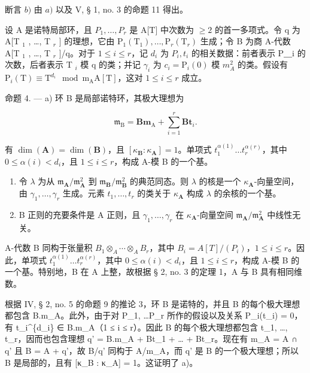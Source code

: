 断言 \(b)\) 由 \(a)\) 以及 V, § 1, no. 3 的命题 11 得出。

设 A 是诺特局部环，且 \(P_{1}, \ldots, P_{r}\) 是 A{[}T{]} 中次数为 \(\geqslant 2\) 的首一多项式。令 q 为 A{[}T \(_{1}\) , \ldots, T \(_{r}\) {]} 的理想，它由 \(\mathrm{P}_{1}(\mathrm{T}_{1}), \ldots, \mathrm{P}_{r}(\mathrm{T}_{r})\) 生成；令 B 为商 A-代数 A{[}T \(_{1}\) , \ldots, T \(_{r}\) {]}/q。对于 \(1 \leqslant i \leqslant r\)，记 \(d_{i}\) 为 \(P_{i}, t_{i}\) 的相关数据：前者表示 P＿i 的次数，后者表示 T \(_{i}\) 模 q 的类；并记 \(\gamma_{i}\) 为 \(c_{i} = \mathrm{P}_{i}(0)\) 模 \(m_{A}^{2}\) 的类。假设有 \(\mathrm{P}_{i}(\mathrm{T}) \equiv \mathrm{T}^{d_{i}} \mod \mathrm{m}_{\mathrm{A}}\mathrm{A}[\mathrm{T}]\)，这对 \(1 \leqslant i \leqslant r\) 成立。

命题 4. --- a) 环 B 是局部诺特环，其极大理想为

\[
\mathfrak {m} _ {\mathrm{B}} = \mathbf {B m} _ {\mathrm{A}} + \sum_ {i = 1} ^ {r} \mathbf {B t} _ {i}.
\]

有 \(\dim(\mathbf{A}) = \dim(\mathbf{B})\)，且 \([\kappa_{\mathbf{B}}: \kappa_{\mathbf{A}}] = 1\)。单项式 \(t_1^{\alpha(1)} \ldots t_r^{\alpha(r)}\)，其中 \(0 \leqslant \alpha(i) < d_i\)，且 \(1 \leqslant i \leqslant r\)，构成 A-模 B 的一个基。

\begin{enumerate}
\def\labelenumi{\alph{enumi})}
\setcounter{enumi}{1}
\item
  令 \(\lambda\) 为从 \(\mathfrak{m}_{\mathbf{A}} / \mathfrak{m}_{\mathbf{A}}^{2}\) 到 \(\mathfrak{m}_{\mathbf{B}} / \mathfrak{m}_{\mathbf{B}}^{2}\) 的典范同态。则 \(\lambda\) 的核是一个 \(\kappa_{\mathbf{A}}\)-向量空间，由 \(\gamma_{1}, \ldots, \gamma_{r}\) 生成。元素 \(t_{1}, \ldots, t_{r}\) 的类关于 \(\kappa_{\mathbf{A}}\) 构成 \(\lambda\) 的余核的一个基。
\item
  B 正则的充要条件是 A 正则，且 \(\gamma_{1},\ldots,\gamma_{r}\) 在 \(\kappa_{\mathbf{A}}\)-向量空间 \(\mathfrak{m}_{\mathbf{A}}/\mathfrak{m}_{\mathbf{A}}^{2}\) 中线性无关。
\end{enumerate}

A-代数 B 同构于张量积 \(B_{1} \otimes_{A} \cdots \otimes_{A} B_{r}\)，其中 \(B_{i} = A[T]/(P_{i})\)，\(1 \leqslant i \leqslant r\)。因此，单项式 \(t_{1}^{\alpha(1)} \ldots t_{r}^{\alpha(r)}\)，其中 \(0 \leqslant \alpha(i) < d_{i}\)，且 \(1 \leqslant i \leqslant r\)，构成 A-模 B 的一个基。特别地，B 在 A 上整，故根据 § 2, no. 3 的定理 1，A 与 B 具有相同维数。

根据 IV, § 2, no. 5 的命题 9 的推论 3，环 B 是诺特的，并且 B 的每个极大理想都包含 B.m\_A。此外，由于对 P\_1, \ldots P\_r 所作的假设以及关系 P\_i(t\_i) = 0，有 t\_i\^{}\{d\_i\} ∈ B.m\_A（1 ≤ i ≤ r）。因此 B 的每个极大理想都包含 t\_1, \ldots, t\_r，因而也包含理想 q' = B.m\_A + Bt\_1 + \ldots{} + Bt\_r。现在有 m\_A = A ∩ q' 且 B = A + q'，故 B/q' 同构于 A/m\_A，而 q' 是 B 的一个极大理想；所以 B 是局部的，且有 {[}κ\_B : κ\_A{]} = 1。这证明了 a)。


